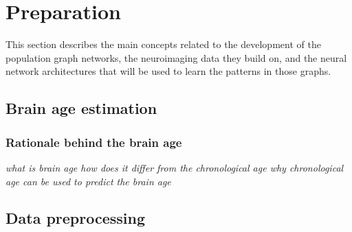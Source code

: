 \chapter{Preparation}

This section describes the main concepts related to the development of the population graph networks, the neuroimaging data they build on, and the neural network architectures that will be used to learn the patterns in those graphs.

\section{Brain age estimation}
\subsection{Rationale behind the brain age}
\textit{what is brain age how does it differ from the chronological age why chronological age can be used to predict the brain age}

\section{Data preprocessing}

